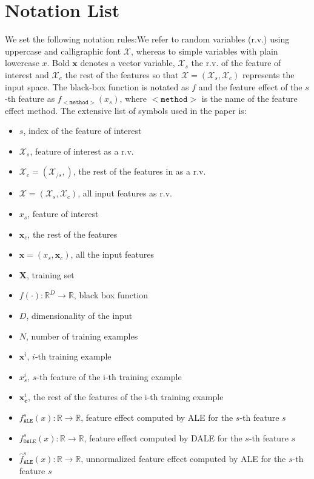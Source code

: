 \documentclass[runningheads, envcountsame, a4paper]{llncs}
\newcommand{\xc}{\mathbf{x}_c}
\newcommand{\Xcb}{\mathcal{X}_c}
\newcommand{\Xs}{\mathcal{X}_s}
\newcommand{\Xb}{\mathcal{X}}
\newcommand{\xci}{\mathbf{x}^i_{\mathbf{c}}}
\newcommand{\xb}{\mathbf{x}}
\newcommand{\R}{\mathbb{R}}
\begin{document}
\section{Notation List}
\label{sec:not-list}
%
We set the following notation rules:We refer to random variables
(r.v.) using uppercase and calligraphic font \( \mathcal{X}\), whereas
to simple variables with plain lowercase \( x \). Bold \( \xb \)
denotes a vector variable, \( \mathcal{X}_s \) the r.v. of the feature
of interest and \( \Xcb \) the rest of the features so that
\( \Xb = (\Xs, \Xcb ) \) represents the input space. The black-box
function is notated as \( f \) and the feature effect of the \(s\)-th
feature as \(f_{\mathtt{<method>}}(x_s)\), where \(\mathtt{<method>}\)
is the name of the feature effect method. The extensive list of
symbols used in the paper is:
%
\begin{itemize}
\item \( s \), index of the feature of interest
\item \( \mathcal{X}_s \), feature of interest as a r.v.
\item \( \mathcal{X}_c = (\mathcal{X}_{/s}, )\), the rest of the features in as a r.v.
\item \( \mathcal{X} = (\mathcal{X}_s, \mathcal{X}_c)\), all input features as r.v.
\item \( x_s \), feature of interest
\item \( \xc \), the rest of the features
\item \( \xb = (x_s, \xc) \), all the input features
\item \( \mathbf{X} \), training set
\item \( f(\cdot) : \R^D \rightarrow \R \), black box function
\item \( D \), dimensionality of the input
\item \( N \), number of training examples
\item \( \xb^i \), \(i\)-th training example
\item \( x^i_s \), \(s\)-th feature of the i-th training example
\item \( \xci \), the rest of the features of the i-th training example
\item \( f_{\mathtt{ALE}}^{s}(x) : \R \rightarrow \R\), feature effect computed by ALE for the \(s\)-th feature \(s\)
\item \( f_{\mathtt{DALE}}^{s}(x) : \R \rightarrow \R\), feature effect computed by DALE for the \(s\)-th feature \(s\)
\item \( \hat{f}_{\mathtt{ALE}}^{s}(x) : \R \rightarrow \R\), unnormalized feature effect computed by ALE for the \(s\)-th feature \(s\)

\end{itemize}
\end{document}
